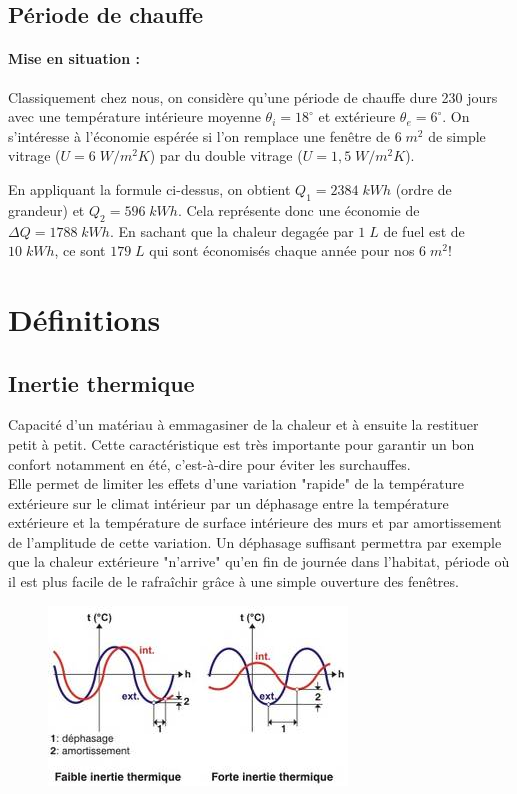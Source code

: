 \documentclass[11pt]{report}
\begin{document}
\subsection{Période de chauffe} 
\paragraph{Mise en situation :} Classiquement chez nous, on considère qu'une période de chauffe dure 230 jours avec une température intérieure moyenne $\theta_i=18^{\circ}$ et extérieure $\theta_e=6^{\circ}$. On s'intéresse à l'économie espérée si l'on remplace une fenêtre de $6 \;m^2$ de simple vitrage ($U=6 \;W/m^2K$) par du double vitrage ($U=1,5 \;W/m^2K$).

En appliquant la formule ci-dessus, on obtient $Q_1=2384\;kWh$ (ordre de grandeur) et $Q_2=596\;kWh$. Cela représente donc une économie de $\Delta Q = 1788 \;kWh$. En sachant que la chaleur degagée par $1\;L$ de fuel est de $10\;kWh$, ce sont $179\;L$ qui sont économisés chaque année pour nos $6\;m^2$!




\section{Définitions}
\subsection{Inertie thermique} Capacité d'un matériau à emmagasiner de la chaleur et à ensuite la restituer petit à petit. Cette caractéristique est très importante pour garantir un bon confort notamment en été, c'est-à-dire pour éviter les surchauffes.\\

Elle permet de limiter les effets d'une variation "rapide" de la température extérieure sur le climat intérieur par un déphasage entre la température extérieure et la température de surface intérieure des murs et par amortissement de l'amplitude de cette variation. Un déphasage suffisant permettra par exemple que la chaleur extérieure "n'arrive" qu'en fin de journée dans l'habitat, période où il est plus facile de le rafraîchir grâce à une simple ouverture des fenêtres.


\begin{figure}[h]
\begin{center}
\includegraphics[width=0.5\linewidth]{RTEmagicC_Inertie_thermique_-_dephasage_et_amortissement.jpg}
\end{center}
\end{figure}
\end{document}
